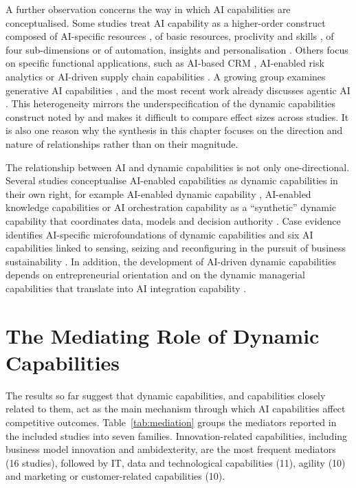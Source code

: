 A further observation concerns the way in which AI capabilities are conceptualised. Some studies treat AI capability as a higher-order construct composed of AI-specific resources , of basic resources, proclivity and skills , of four sub-dimensions  or of automation, insights and personalisation . Others focus on specific functional applications, such as AI-based CRM , AI-enabled risk analytics  or AI-driven supply chain capabilities . A growing group examines generative AI capabilities , and the most recent work already discusses agentic AI . This heterogeneity mirrors the underspecification of the dynamic capabilities construct noted by \textcite[390]{schilke2018} and makes it difficult to compare effect sizes across studies. It is also one reason why the synthesis in this chapter focuses on the direction and nature of relationships rather than on their magnitude.

The relationship between AI and dynamic capabilities is not only one-directional. Several studies conceptualise AI-enabled capabilities as dynamic capabilities in their own right, for example AI-enabled dynamic capability , AI-enabled knowledge capabilities  or AI orchestration capability as a \enquote{synthetic} dynamic capability that coordinates data, models and decision authority . Case evidence identifies AI-specific microfoundations of dynamic capabilities  and six AI capabilities linked to sensing, seizing and reconfiguring in the pursuit of business sustainability . In addition, the development of AI-driven dynamic capabilities depends on entrepreneurial orientation  and on the dynamic managerial capabilities that translate into AI integration capability .

\section{The Mediating Role of Dynamic Capabilities}
\label{sec:mediation}

The results so far suggest that dynamic capabilities, and capabilities closely related to them, act as the main mechanism through which AI capabilities affect competitive outcomes. Table~\ref{tab:mediation} groups the mediators reported in the included studies into seven families. Innovation-related capabilities, including business model innovation and ambidexterity, are the most frequent mediators (16 studies), followed by IT, data and technological capabilities (11), agility (10) and marketing or customer-related capabilities (10).

